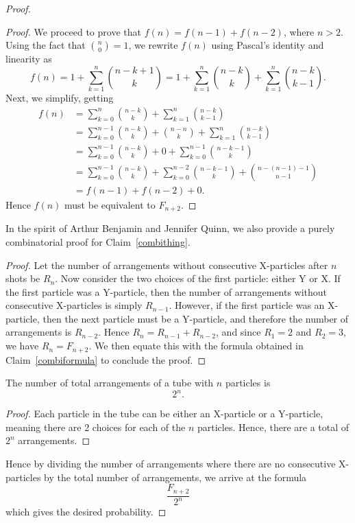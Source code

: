 \begin{proof}
\begin{proof}
  We proceed to prove that $f(n) = f(n-1) + f(n-2)$, where $n > 2$. Using the fact that $\binom{n}{0} = 1$, we rewrite $f(n)$ using Pascal's identity and linearity as \[
    f(n) = 1 + \sum_{k=1}^n \binom{n-k+1}{k} = 1 + \sum_{k=1}^n \binom{n-k}{k} + \sum_{k=1}^n \binom{n-k}{k-1}.
  \] Next, we simplify, getting
  \begin{align*}
    f(n) &= \sum_{k=0}^n \binom{n - k}{k} + \sum_{k=1}^n \binom{n-k}{k-1} \\
         &= \sum_{k=0}^{n-1} \binom{n-k}{k} + \binom{n-n}{k} + \sum_{k=1}^n \binom{n-k}{k-1} \\
         &= \sum_{k=0}^{n-1} \binom{n-k}{k} + 0 + \sum_{k=0}^{n-1} \binom{n-k-1}{k} \\
         &= \sum_{k=0}^{n-1} \binom{n-k}{k} + \sum_{k=0}^{n-2} \binom{n-k-1}{k} + \binom{n-(n-1)-1}{n-1} \\
         &= f(n-1) + f(n-2) + 0.
  \end{align*}
  Hence $f(n)$ must be equivalent to $F_{n+2}$.
\end{proof}
In the spirit of Arthur Benjamin and Jennifer Quinn, we also provide a purely combinatorial proof for Claim~\ref{combithing}.
\begin{proof}
  Let the number of arrangements without consecutive X-particles after $n$ shots be $R_n$. Now consider the two choices of the first particle: either Y or X. If the first particle was a Y-particle, then the number of arrangements without consecutive X-particles is simply $R_{n-1}$. However, if the first particle was an X-particle, then the next particle must be a Y-particle, and therefore the number of arrangements is $R_{n-2}$. Hence $R_{n} = R_{n-1} + R_{n-2}$, and since $R_1 = 2$ and  $R_2 = 3$, we have $R_{n} = F_{n+2}$. We then equate this with the formula obtained in Claim~\ref{combiformula} to conclude the proof.
\end{proof}
\begin{claim}
  The number of total arrangements of a tube with $n$ particles is \[2^n.\]
\end{claim}
\begin{proof}
  Each particle in the tube can be either an X-particle or a Y-particle, meaning there are 2 choices for each of the $n$ particles. Hence, there are a total of $2^n$ arrangements.
\end{proof}
Hence by dividing the number of arrangements where there are no consecutive X-particles by the total number of arrangements, we arrive at the formula \[\frac{F_{n+2}}{2^n}\] which gives the desired probability.
\end{proof}

